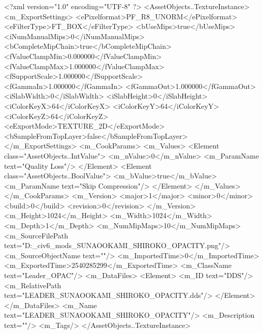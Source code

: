 <?xml version="1.0" encoding="UTF-8" ?>
<AssetObjects..TextureInstance>
	<m_ExportSettings>
		<ePixelformat>PF_R8_UNORM</ePixelformat>
		<eFilterType>FT_BOX</eFilterType>
		<bUseMips>true</bUseMips>
		<iNumManualMips>0</iNumManualMips>
		<bCompleteMipChain>true</bCompleteMipChain>
		<fValueClampMin>0.000000</fValueClampMin>
		<fValueClampMax>1.000000</fValueClampMax>
		<fSupportScale>1.000000</fSupportScale>
		<fGammaIn>1.000000</fGammaIn>
		<fGammaOut>1.000000</fGammaOut>
		<iSlabWidth>0</iSlabWidth>
		<iSlabHeight>0</iSlabHeight>
		<iColorKeyX>64</iColorKeyX>
		<iColorKeyY>64</iColorKeyY>
		<iColorKeyZ>64</iColorKeyZ>
		<eExportMode>TEXTURE_2D</eExportMode>
		<bSampleFromTopLayer>false</bSampleFromTopLayer>
	</m_ExportSettings>
	<m_CookParams>
		<m_Values>
			<Element class="AssetObjects..IntValue">
				<m_nValue>0</m_nValue>
				<m_ParamName text="Quality Loss"/>
			</Element>
			<Element class="AssetObjects..BoolValue">
				<m_bValue>true</m_bValue>
				<m_ParamName text="Skip Compression"/>
			</Element>
		</m_Values>
	</m_CookParams>
	<m_Version>
		<major>1</major>
		<minor>0</minor>
		<build>0</build>
		<revision>0</revision>
	</m_Version>
	<m_Height>1024</m_Height>
	<m_Width>1024</m_Width>
	<m_Depth>1</m_Depth>
	<m_NumMipMaps>10</m_NumMipMaps>
	<m_SourceFilePath text="D:\Documents\GitHub\Uzuki_civ6_mods\BankHeisters\LEADER_SUNAOOKAMI_SHIROKO_OPACITY.png"/>
	<m_SourceObjectName text=""/>
	<m_ImportedTime>0</m_ImportedTime>
	<m_ExportedTime>2540285299</m_ExportedTime>
	<m_ClassName text="Leader_OPAC"/>
	<m_DataFiles>
		<Element>
			<m_ID text="DDS"/>
			<m_RelativePath text="LEADER_SUNAOOKAMI_SHIROKO_OPACITY.dds"/>
		</Element>
	</m_DataFiles>
	<m_Name text="LEADER_SUNAOOKAMI_SHIROKO_OPACITY"/>
	<m_Description text=""/>
	<m_Tags/>
</AssetObjects..TextureInstance>

